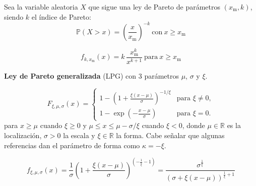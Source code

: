 


\begin{f}
	Sea la variable aleatoria \(X\) que sigue una ley de Pareto de parámetros \((x_{\mathrm{m}},k)\), siendo \(k\) el índice de Pareto:
	\[
	\mathbb{P}(X>x)=\left(\frac{x}{x_{\mathrm{m}}}\right)^{-k}\ \mbox{con}\ x \geq x_{\mathrm{m}} 
	\]
	
	\[
	f_{k,x_\mathrm{m}}(x) = k\,\frac{x_\mathrm{m}^k}{x^{k+1}}\ \mbox{para}\ x \ge x_\mathrm{m}
	\]
	
	\textbf{Ley de Pareto generalizada} (LPG) con 3 parámetros \(\mu\), \(\sigma\) y \(\xi\).
	
	
	\[
	F_{\xi,\mu,\sigma}(x) = \begin{cases} 1 - \left(1+ \frac{\xi(x-\mu)}{\sigma}\right)^{-1/\xi} & \text{para }\xi \neq 0, \\ 1 - \exp \left(-\frac{x-\mu}{\sigma}\right) & \text{para }\xi = 0. \end{cases} 
	\]
	para \(x \geq \mu\) cuando \(\xi \geq 0\) y \( \mu \leq x \leq \mu - \sigma /\xi\) cuando \( \xi < 0\), donde \(\mu\in\mathbb{R}\) es la localización, \(\sigma>0\) la escala y  \(\xi\in\mathbb{R}\) la forma. 
	Cabe señalar que algunas referencias dan el parámetro de forma como \(\kappa = - \xi\).

\[
f_{\xi,\mu,\sigma}(x) = \frac{1}{\sigma}\left(1 + \frac{\xi (x-\mu)}{\sigma}\right)^{\left(-\frac{1}{\xi} - 1\right)}
=
 \frac{\sigma^{\frac{1}{\xi}}}{\left(\sigma + \xi (x-\mu)\right)^{\frac{1}{\xi}+1}}
\]

\medskip

\begin{center}
		


\end{center}
\end{f}
